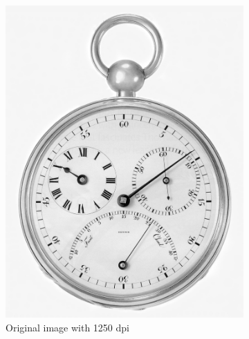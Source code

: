 \documentclass[UTF8]{ctexart}
\begin{document}
\begin{figure}[htbp]
    \centering
    \begin{subfigure}{0.3\textwidth}
        \centering
        \includegraphics[width=\linewidth]{chronometer 1250 dpi.jpg}
        \caption{Original image with 1250 dpi}
    \end{subfigure}%
    \hfill
    \begin{subfigure}{0.3\textwidth}
        \centering

\end{subfigure}
\end{figure}
\end{document}
